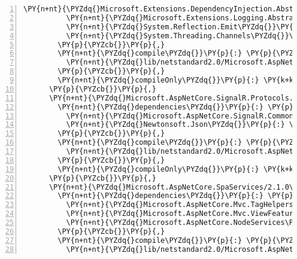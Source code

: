 \begin{Verbatim}[commandchars=\\\{\},numbers=left,firstnumber=1,stepnumber=1,numberblanklines=0]
          \PY{n+nt}{\PYZdq{}Microsoft.Extensions.DependencyInjection.Abstractions\PYZdq{}}\PY{p}{:} \PY{l+s+s2}{\PYZdq{}2.1.0\PYZhy{}rc1\PYZhy{}final\PYZdq{}}\PY{p}{,}
          \PY{n+nt}{\PYZdq{}Microsoft.Extensions.Logging.Abstractions\PYZdq{}}\PY{p}{:} \PY{l+s+s2}{\PYZdq{}2.1.0\PYZhy{}rc1\PYZhy{}final\PYZdq{}}\PY{p}{,}
          \PY{n+nt}{\PYZdq{}System.Reflection.Emit\PYZdq{}}\PY{p}{:} \PY{l+s+s2}{\PYZdq{}4.3.0\PYZdq{}}\PY{p}{,}
          \PY{n+nt}{\PYZdq{}System.Threading.Channels\PYZdq{}}\PY{p}{:} \PY{l+s+s2}{\PYZdq{}4.5.0\PYZhy{}rc1\PYZdq{}}
        \PY{p}{\PYZcb{}}\PY{p}{,}
        \PY{n+nt}{\PYZdq{}compile\PYZdq{}}\PY{p}{:} \PY{p}{\PYZob{}}
          \PY{n+nt}{\PYZdq{}lib/netstandard2.0/Microsoft.AspNetCore.SignalR.Core.dll\PYZdq{}}\PY{p}{:} \PY{p}{\PYZob{}}\PY{p}{\PYZcb{}}
        \PY{p}{\PYZcb{}}\PY{p}{,}
        \PY{n+nt}{\PYZdq{}compileOnly\PYZdq{}}\PY{p}{:} \PY{k+kc}{true}
      \PY{p}{\PYZcb{}}\PY{p}{,}
      \PY{n+nt}{\PYZdq{}Microsoft.AspNetCore.SignalR.Protocols.Json/1.0.0\PYZhy{}rc1\PYZhy{}final\PYZdq{}}\PY{p}{:} \PY{p}{\PYZob{}}
        \PY{n+nt}{\PYZdq{}dependencies\PYZdq{}}\PY{p}{:} \PY{p}{\PYZob{}}
          \PY{n+nt}{\PYZdq{}Microsoft.AspNetCore.SignalR.Common\PYZdq{}}\PY{p}{:} \PY{l+s+s2}{\PYZdq{}1.0.0\PYZhy{}rc1\PYZhy{}final\PYZdq{}}\PY{p}{,}
          \PY{n+nt}{\PYZdq{}Newtonsoft.Json\PYZdq{}}\PY{p}{:} \PY{l+s+s2}{\PYZdq{}11.0.2\PYZdq{}}
        \PY{p}{\PYZcb{}}\PY{p}{,}
        \PY{n+nt}{\PYZdq{}compile\PYZdq{}}\PY{p}{:} \PY{p}{\PYZob{}}
          \PY{n+nt}{\PYZdq{}lib/netstandard2.0/Microsoft.AspNetCore.SignalR.Protocols.Json.dll\PYZdq{}}\PY{p}{:} \PY{p}{\PYZob{}}\PY{p}{\PYZcb{}}
        \PY{p}{\PYZcb{}}\PY{p}{,}
        \PY{n+nt}{\PYZdq{}compileOnly\PYZdq{}}\PY{p}{:} \PY{k+kc}{true}
      \PY{p}{\PYZcb{}}\PY{p}{,}
      \PY{n+nt}{\PYZdq{}Microsoft.AspNetCore.SpaServices/2.1.0\PYZhy{}rc1\PYZhy{}final\PYZdq{}}\PY{p}{:} \PY{p}{\PYZob{}}
        \PY{n+nt}{\PYZdq{}dependencies\PYZdq{}}\PY{p}{:} \PY{p}{\PYZob{}}
          \PY{n+nt}{\PYZdq{}Microsoft.AspNetCore.Mvc.TagHelpers\PYZdq{}}\PY{p}{:} \PY{l+s+s2}{\PYZdq{}2.1.0\PYZhy{}rc1\PYZhy{}final\PYZdq{}}\PY{p}{,}
          \PY{n+nt}{\PYZdq{}Microsoft.AspNetCore.Mvc.ViewFeatures\PYZdq{}}\PY{p}{:} \PY{l+s+s2}{\PYZdq{}2.1.0\PYZhy{}rc1\PYZhy{}final\PYZdq{}}\PY{p}{,}
          \PY{n+nt}{\PYZdq{}Microsoft.AspNetCore.NodeServices\PYZdq{}}\PY{p}{:} \PY{l+s+s2}{\PYZdq{}2.1.0\PYZhy{}rc1\PYZhy{}final\PYZdq{}}
        \PY{p}{\PYZcb{}}\PY{p}{,}
        \PY{n+nt}{\PYZdq{}compile\PYZdq{}}\PY{p}{:} \PY{p}{\PYZob{}}
          \PY{n+nt}{\PYZdq{}lib/netstandard2.0/Microsoft.AspNetCore.SpaServices.dll\PYZdq{}}\PY{p}{:} \PY{p}{\PYZob{}}\PY{p}{\PYZcb{}}

\end{Verbatim}
